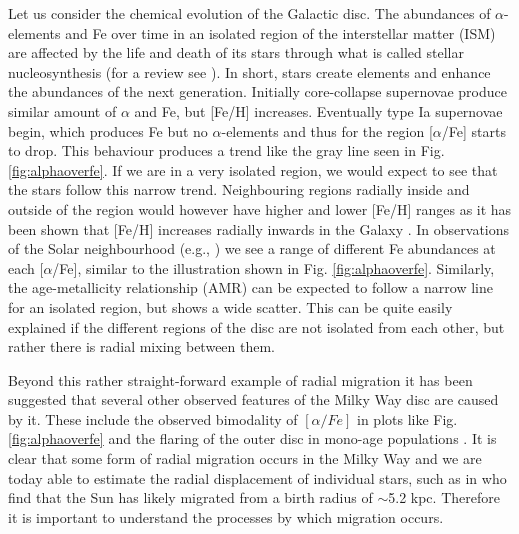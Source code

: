 Let us consider the chemical evolution of the Galactic disc. The abundances of $\alpha$-elements and Fe over time in an isolated region of the interstellar matter (ISM) are affected by the life and death of its stars through what is called stellar nucleosynthesis (for a review see \citealt{edvardsson:1993}). In short, stars create elements and enhance the abundances of the next generation. Initially core-collapse supernovae produce similar amount of $\alpha$ and Fe, but [Fe/H] increases. Eventually type Ia supernovae begin, which produces Fe but no $\alpha$-elements and thus for the region [$\alpha$/Fe] starts to drop. This behaviour produces a trend like the gray line seen in Fig. \ref{fig:alphaoverfe}. If we are in a very isolated region, we would expect to see that the stars follow this narrow trend. Neighbouring regions radially inside and outside of the region would however have higher and lower [Fe/H] ranges as it has been shown that [Fe/H] increases radially inwards in the Galaxy \citep[e.g.,][]{hayden:15}. In observations of the Solar neighbourhood (e.g., \citealt{edvardsson:1993, hayden:15, bensby:14}) we see a range of different Fe abundances at each [$\alpha$/Fe], similar to the illustration shown in Fig. \ref{fig:alphaoverfe}. Similarly, the age-metallicity relationship (AMR) can be expected to follow a narrow line for an isolated region, but shows a wide scatter. This can be quite easily explained if the different regions of the disc are not isolated from each other, but rather there is radial mixing between them. 

Beyond this rather straight-forward example of radial migration it has been suggested that several other observed features of the Milky Way disc are caused by it. These include the observed bimodality of $[\alpha/Fe]$ in plots like Fig. \ref{fig:alphaoverfe} \citep{schonrich:09, toyouchi:2016} and the flaring of the outer disc in mono-age populations \citep{minchev:12}. It is clear that some form of radial migration occurs in the Milky Way and we are today able to estimate the radial displacement of individual stars, such as in \cite{frankel:18} who find that the Sun has likely migrated from a birth radius of {$\sim$}5.2 kpc. Therefore it is important to understand the processes by which migration occurs.

